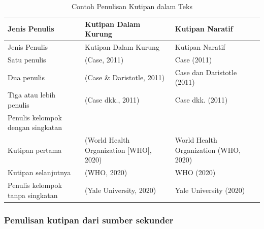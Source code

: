 \documentclass[
  indonesian,
  letterpaper,
]{scrbook}
\begin{document}
\begin{longtable}[]{@{}
  >{\raggedright\arraybackslash}p{}
  >{\raggedright\arraybackslash}p{}
  >{\raggedright\arraybackslash}p{}@{}}
\caption{Contoh Penulisan Kutipan dalam
Teks}\label{tbl-kutipanteks}\tabularnewline
\toprule\noalign{}
\begin{minipage}[b]{\linewidth}\raggedright
Jenis Penulis
\end{minipage} & \begin{minipage}[b]{\linewidth}\raggedright
Kutipan Dalam Kurung
\end{minipage} & \begin{minipage}[b]{\linewidth}\raggedright
Kutipan Naratif
\end{minipage} \\
\midrule\noalign{}
\endfirsthead
\toprule\noalign{}
\begin{minipage}[b]{\linewidth}\raggedright
Jenis Penulis
\end{minipage} & \begin{minipage}[b]{\linewidth}\raggedright
Kutipan Dalam Kurung
\end{minipage} & \begin{minipage}[b]{\linewidth}\raggedright
Kutipan Naratif
\end{minipage} \\
\midrule\noalign{}
\endhead
\bottomrule\noalign{}
\endlastfoot
Satu penulis & (Case, 2011) & Case (2011) \\
Dua penulis & (Case \& Daristotle, 2011) & Case dan Daristotle (2011) \\
Tiga atau lebih penulis & (Case dkk., 2011) & Case dkk. (2011) \\
Penulis kelompok dengan singkatan & & \\
Kutipan pertama & (World Health Organization {[}WHO{]}, 2020) & World
Health Organization (WHO, 2020) \\
Kutipan selanjutnya & (WHO, 2020) & WHO (2020) \\
Penulis kelompok tanpa singkatan & (Yale University, 2020) & Yale
University (2020) \\
\end{longtable}

\subsubsection{Penulisan kutipan dari sumber
sekunder}\label{penulisan-kutipan-dari-sumber-sekunder}
\end{document}
